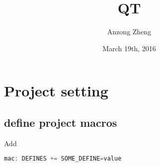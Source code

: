 \documentclass[10pt,a4paper]{article}
\begin{document}
\author{Anzong Zheng}
\title{QT}
\date{March 19th, 2016}
\maketitle
\newpage

\section{Project setting}
\subsection{define project macros}
Add 
\begin{lstlisting}[language = C++]
mac: DEFINES += SOME_DEFINE=value
\end{lstlisting}
\end{document}

